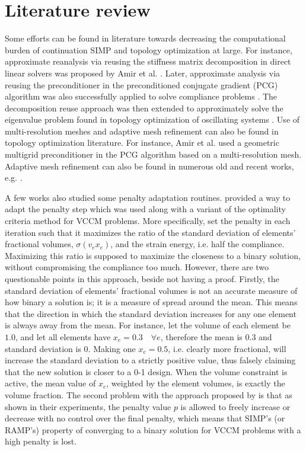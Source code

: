 \section{Literature review}

Some efforts can be found in literature towards decreasing the computational burden of continuation SIMP and topology optimization at large. For instance, approximate reanalysis via reusing the stiffness matrix decomposition in direct linear solvers was proposed by Amir et al. \cite{Amir2009}. Later, approximate analysis via reusing the preconditioner in the preconditioned conjugate gradient (PCG) algorithm was also successfully applied to solve compliance problems \citep{Amir2015}. The decomposition reuse approach was then extended to approximately solve the eigenvalue problem found in topology optimization of oscillating systems \citep{Zheng2017}. Use of multi-resolution meshes and adaptive mesh refinement can also be found in topology optimization literature. For instance, Amir et al. \cite{Amir2014} used a geometric multigrid preconditioner in the PCG algorithm based on a multi-resolution mesh. Adaptive mesh refinement can also be found in numerous old and recent works, e.g. \cite{Maute1995,Maute1997,Stainko2006,Wang2010a,Wang2010a,Bruggi2011,Wang2013,Wang2014,SalazardeTroya2018,Lambe2018}.

A few works also studied some penalty adaptation routines. \cite{Dadalau2009} provided a way to adapt the penalty step which was used along with a variant of the optimality criteria method for VCCM problems. More specifically, \cite{Dadalau2009} set the penalty in each iteration such that it maximizes the ratio of the standard deviation of elements' fractional volumes, $\sigma(v_e x_e)$, and the strain energy, i.e. half the compliance. Maximizing this ratio is supposed to maximize the closeness to a binary solution, without compromising the compliance too much. However, there are two questionable points in this approach, beside not having a proof. Firstly, the standard deviation of elements' fractional volumes is not an accurate measure of how binary a solution is; it is a measure of spread around the mean. This means that the direction in which the standard deviation increases for any one element is always away from the mean. For instance, let the volume of each element be $1.0$, and let all elements have $x_e = 0.3 \quad \forall e$, therefore the mean is $0.3$ and standard deviation is $0$. Making one $x_e = 0.5$, i.e. clearly more fractional, will increase the standard deviation to a strictly positive value, thus falsely claiming that the new solution is closer to a 0-1 design. When the volume constraint is active, the mean value of $x_e$, weighted by the element volumes, is exactly the volume fraction. The second problem with the approach proposed by \cite{Dadalau2009} is that as shown in their experiments, the penalty value $p$ is allowed to freely increase or decrease with no control over the final penalty, which means that SIMP's (or RAMP's) property of converging to a binary solution for VCCM problems with a high penalty is lost.

